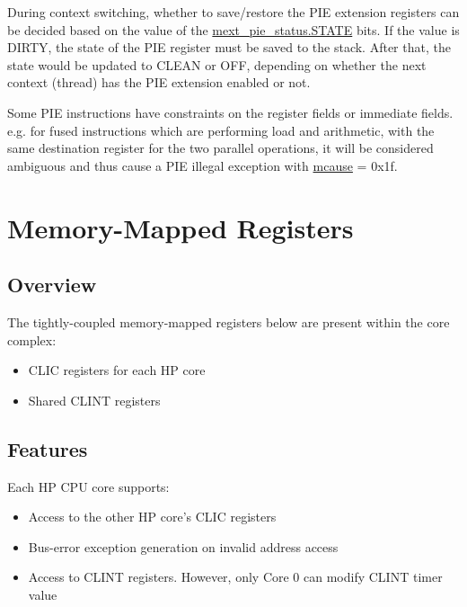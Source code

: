 \documentclass[main\_\_EN.tex]{subfiles}
\begin{document}
During context switching, whether to save/restore the PIE extension registers can be decided based on the value of the \hyperref[fielddesc:MEXT_PIE_STATE]{mext\_pie\_status.STATE} bits. If the value is DIRTY, the state of the PIE register must be saved to the stack. After that, the state would be updated to CLEAN or OFF, depending on whether the next context (thread) has the PIE extension enabled or not.

Some PIE instructions have constraints on the register fields or immediate fields. e.g. for fused instructions which are performing load and arithmetic, with the same destination register for the two parallel operations, it will be considered ambiguous and thus cause a PIE illegal exception with \hyperref[regdesc:MCAUSE]{mcause} = 0x1f.

\newpage
\section{Memory-Mapped Registers}
\label{sec:riscvcpu-tcip}

\subsection{Overview}
\label{sec:riscvcpu-tcip-overview}


The tightly-coupled memory-mapped registers below are present within the core complex:

\begin{itemize}
    \item CLIC registers for each HP core
    \item Shared CLINT registers
\end{itemize}

\subsection{Features}
\label{sec:riscvcpu-tcip-features}

Each HP CPU core supports:
\begin{itemize}
    \item Access to the other HP core's CLIC registers
    \item Bus-error exception generation on invalid address access
    \item Access to CLINT registers. However, only Core 0 can modify CLINT timer value
\end{itemize}
\end{document}
